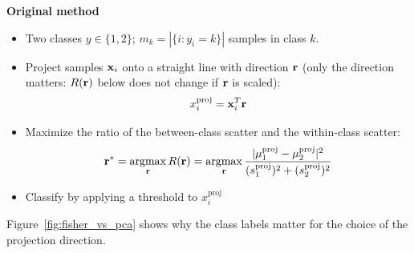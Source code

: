 \textbf{Original method}
		\begin{itemize}
			\item Two classes $y\in\{1,2\}$; $m_k=|\{i:y_i=k\}|$ samples in class $k$.
			\item Project samples $\bm{\mathrm{x}}_i$ onto a straight line with direction $\bm{\mathrm{r}}$ (only the direction matters: $R(\bm{\mathrm{r}})$ below does not change if $\bm{\mathrm{r}}$ is scaled):
			      \begin{displaymath}
				      x_i^{\mathrm{proj}} = \bm{\mathrm{x}}_i^T \bm{\mathrm{r}}
			      \end{displaymath}
			\item Maximize the ratio of the between-class scatter and the within-class scatter:
			      \begin{displaymath}
				      \bm{\mathrm{r}}^* =
				      \operatorname*{argmax}_{\bm{\mathrm{r}}} R(\bm{\mathrm{r}}) =
				      \operatorname*{argmax}_{\bm{\mathrm{r}}} \frac{|\mu_1^{\mathrm{proj}} - \mu_2^{\mathrm{proj}}|^2}{(s_1^{\mathrm{proj}})^2 + (s_2^{\mathrm{proj}})^2}
			      \end{displaymath}
			\item Classify by applying a threshold to $x_i^{\mathrm{proj}}$
		\end{itemize}
	Figure~\ref{fig:fisher_vs_pca} shows why the class labels matter for the choice of the projection direction.

